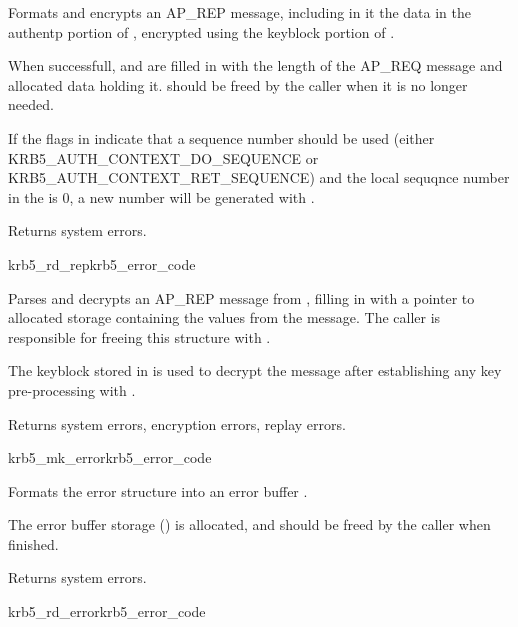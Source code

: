 Formats and encrypts an AP_REP message, including in it the data in the
authentp portion of , encrypted using the
keyblock portion of . 

When successfull,  and
 are filled in with the length of the
AP_REQ message and allocated data holding it.
 should be freed by the
caller when it is no longer needed. 

If the flags in  indicate that a sequence number
should be used (either {\sc KRB5_AUTH_CONTEXT_DO_SEQUENCE} or
{\sc KRB5_AUTH_CONTEXT_RET_SEQUENCE}) and the local sequqnce number in the
 is 0, a new number will be generated with
.

Returns system errors.

\begin{funcdecl}{krb5_rd_rep}{krb5_error_code}{\funcinout}
\funcin
{}
\funcout
{}
\end{funcdecl}

Parses and decrypts an AP_REP message from , filling in
 with a pointer to  allocated storage containing the
values from the message.  The caller is responsible for freeing this
structure with .

The keyblock stored in  is used to decrypt the
message after establishing any key pre-processing with
. 

Returns system errors, encryption errors, replay errors.

\begin{funcdecl}{krb5_mk_error}{krb5_error_code}{\funcinout}
\funcin
{}
\funcout
{}
\end{funcdecl}

Formats the error structure  into an error buffer
.

The error buffer storage () is
allocated, and should be freed by the caller when finished.

Returns system errors.

\begin{funcdecl}{krb5_rd_error}{krb5_error_code}{\funcinout}
\funcin
{}
\funcout
{}
\end{funcdecl}


